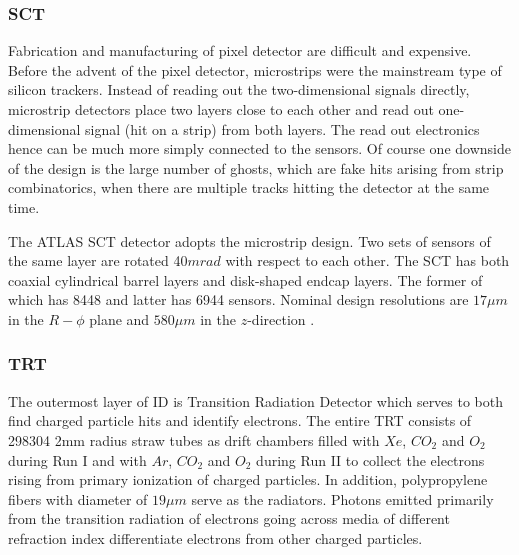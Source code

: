 \subsubsection{SCT}

Fabrication and manufacturing of pixel detector are difficult and expensive. Before the advent of the pixel detector, microstrips were the mainstream type of silicon trackers. Instead of reading out the two-dimensional signals directly, microstrip detectors place two layers close to each other and read out one-dimensional signal (hit on a strip) from both layers. The read out electronics hence can be much more simply connected to the sensors. Of course one downside of the design is the large number of ghosts, which are fake hits arising from strip combinatorics, when there are multiple tracks hitting the detector at the same time.

The ATLAS SCT detector adopts the microstrip design. Two sets of sensors of the same layer are rotated 40$mrad$ with respect to each other. The SCT has both coaxial cylindrical barrel layers and disk-shaped endcap layers. The former of which has 8448 and latter has 6944 sensors\cite{SCTpaper}. Nominal design resolutions are $17\mu m$ in the $R-\phi$ plane and $580 \mu m$ in the $z$-direction \cite{PERF-2007-01}.


\subsubsection{TRT}

The outermost layer of ID is Transition Radiation Detector which serves to both find charged particle hits and identify electrons. The entire TRT consists of 298304 2mm radius straw tubes\cite{TRTpaper} as drift chambers filled with $Xe$, $CO_2$ and $O_2$ during Run I and with $Ar$, $CO_2$ and $O_2$ during Run II to collect the electrons rising from primary ionization of charged particles. In addition, polypropylene fibers with diameter of $19\mu m$ serve as the radiators. Photons emitted primarily from the transition radiation of electrons going across media of different refraction index differentiate electrons from other charged particles. 
